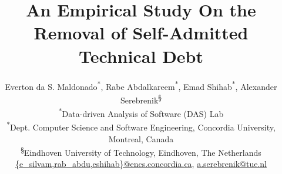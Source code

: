 \documentclass[10pt, conference]{IEEEtran}
\begin{document}
	
\title{An Empirical Study On the Removal of Self-Admitted Technical Debt}
\author{
	Everton da S. Maldonado\textsuperscript{*}, Rabe Abdalkareem\textsuperscript{*}, Emad Shihab\textsuperscript{*}, Alexander Serebrenik\textsuperscript{\S}\\
\textsuperscript{*}Data-driven Analysis of Software (DAS) Lab\\
\textsuperscript{*}Dept. Computer Science and Software Engineering, Concordia University, Montreal, Canada\\
\textsuperscript{\S}Eindhoven University of Technology, Eindhoven, The Netherlands\\
\url{{e_silvam,rab_abdu,eshihab}@encs.concordia.ca}, \url{a.serebrenik@tue.nl}
}

\end{document}
